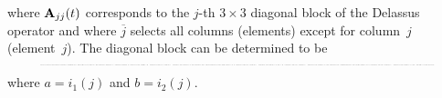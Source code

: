 \documentclass[global,twocolumn]{svjour}
\let\vec\bm
\newcommand{\mat}[1]{{\bf #1}}
\newcommand{\cross}{\times}
\newcommand{\pos}    [1]{\ensuremath{\vec{x}_{#1}}}
\newcommand{\orient} [1]{\ensuremath{\vec{\varphi}_{#1}}}
\newcommand{\mass}   [1]{\ensuremath{m_{#1}}}
\newcommand{\inertia}[1]{\ensuremath{\mat{I}_{#1}}}
\newcommand{\identmat}[1]{\ensuremath{\mat{E}_{#1}}}
\newcommand{\contactpos}    [1]{\ensuremath{\vec{\hat{x}}_{#1}}}
\newcommand{\shrinkeqnnew}[2]{\resizebox{#1\linewidth}{!}{\begin{varwidth}[t]{2\linewidth}\ensuremath{\displaystyle{#2}}\end{varwidth}}}
\begin{document}
		where $\mat{A}_{jj}(t)$ corresponds to the $j$-th $3 \times 3$ diagonal
		block of the Delassus operator and where $\overline{j}$ selects all
		columns (elements) except for column~$j$ (element~$j$). The diagonal block
		can be determined to be~\cite{mirtich96,preclik14}
		\begin{equation}
			\shrinkeqnnew{0.9}{
			\begin{split}
				\mat{A}_{jj}(t) & = (\mass{a}^{-1} + \mass{b}^{-1}) \identmat{3} \\
				& - (\contactpos{j}(t) - \pos{a}(t))^\cross \inertia{aa}(\orient{a}(t))^{-1} (\contactpos{j}(t) - \pos{a}(t))^\cross \\
				& - (\contactpos{j}(t) - \pos{b}(t))^\cross \inertia{bb}(\orient{b}(t))^{-1} (\contactpos{j}(t) - \pos{b}(t))^\cross,
			\end{split}
			}
			\label{eq:diagblock}
		\end{equation}
		where $a = i_1(j)$ and $b = i_2(j)$.
\end{document}
